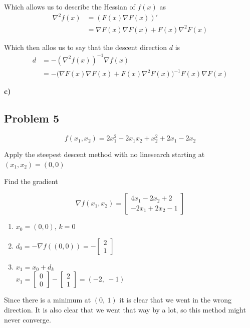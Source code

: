 Which allows us to describe the Hessian of $f(x)$  as
\begin{align*}
\nabla^2 f(x) &= (F(x) \nabla F(x))' \\
&= \nabla F(x) \nabla F(x) + F(x) \nabla^2 F(x)
\end{align*}

Which then allos us to say that the descent direction $d$ is
\begin{align*}
	d &= - (\nabla^2 f(x))^{-1} \nabla f(x) \\
	  &= - \Bigg(\nabla F(x) \nabla F(x) + F(x) \nabla^2 F(x) \Bigg)^{-1} F(x) \nabla F(x)
\end{align*}


\textbf{c)}

\incomplete

\subsection{Problem 5}

\[
f(x_1, x_2) = 2x_1^2 -2x_1x_2 + x_2^2 + 2x_1 -2x_2
\]

Apply the steepest descent method with no linesearch starting at $(x_1, x_2) = (0,0)$

\answer

Find the gradient

\[
	\nabla f(x_1, x_2) = 
	\begin{bmatrix}
		4x_1 - 2x_2 + 2 \\
		-2x_1 + 2x_2 - 1	
	\end{bmatrix}
\]

\begin{enumerate}
\item $x_0 = (0,0)$, $k = 0$
\item $d_0 = - \nabla f((0,0)) = - \begin{bmatrix}
2 \\
1
\end{bmatrix}$
\item $x_1 = x_0 + d_k$ \\
$x_1 = \begin{bmatrix}
0 \\ 0
\end{bmatrix} - \begin{bmatrix}
2 \\ 1
\end{bmatrix} = (-2,\ -1)$
\end{enumerate}

Since there is a minimum at $(0,\ 1)$ it is clear that we went in the wrong direction. It is also clear that we went that way by a lot, so this method might never converge.

